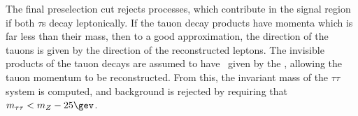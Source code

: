 The final preselection cut rejects \Ztautaunody processes,
which contribute in the signal region if both $\tau$s decay
leptonically. If the tauon decay products have momenta which is
far less than their mass, then to a good approximation, the direction
of the tauons is given by the direction of the reconstructed
leptons. The invisible products of the tauon decays are assumed to
have \pt~given by the \etmiss, allowing the tauon momentum to be
reconstructed. From this, the invariant mass of the $\tau\tau$ system
is computed, and \Ztautaunody background is rejected by
requiring that $\mtt < m_Z - 25 \gev$. 

